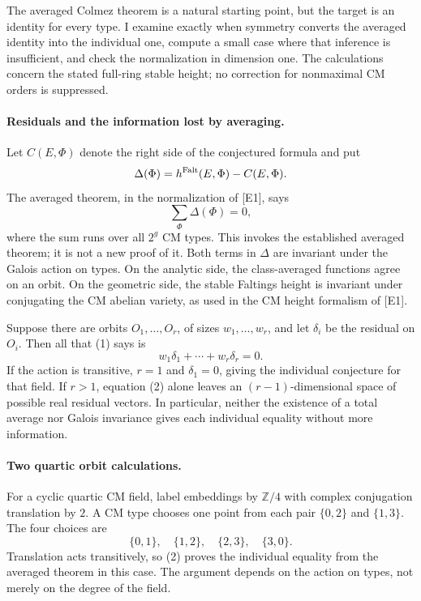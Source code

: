 \documentclass[11pt]{article}
\begin{document}
The averaged Colmez theorem is a natural starting point, but the target
is an identity for every type. I examine exactly when symmetry converts
the averaged identity into the individual one, compute a small case
where that inference is insufficient, and check the normalization in
dimension one. The calculations concern the stated full-ring stable
height; no correction for nonmaximal CM orders is suppressed.

\paragraph{Residuals and the information lost by averaging.}
Let $C(E,\Phi)$ denote the right side of the conjectured formula and put
\[
 \Delta(\Phi)=h^{\rm Falt}(E,\Phi)-C(E,\Phi).
\]
The averaged theorem, in the normalization of [E1], says
\[
 \sum_{\Phi}\Delta(\Phi)=0,                           \tag{1}
\]
where the sum runs over all $2^g$ CM types. This invokes the established
averaged theorem; it is not a new proof of it. Both terms in $\Delta$
are invariant under the Galois action on types. On the analytic side,
the class-averaged functions agree on an orbit. On the geometric side,
the stable Faltings height is invariant under conjugating the CM
abelian variety, as used in the CM height formalism of [E1].

Suppose there are orbits $O_1,\ldots,O_r$, of sizes $w_1,\ldots,w_r$,
and let $\delta_i$ be the residual on $O_i$. Then all that (1) says is
\[
 w_1\delta_1+\cdots+w_r\delta_r=0.                    \tag{2}
\]
If the action is transitive, $r=1$ and $\delta_1=0$, giving the
individual conjecture for that field. If $r>1$, equation (2) alone
leaves an $(r-1)$-dimensional space of possible real residual vectors.
In particular, neither the existence of a total average nor Galois
invariance gives each individual equality without more information.

\paragraph{Two quartic orbit calculations.}
For a cyclic quartic CM field, label embeddings by $\mathbb Z/4$ with
complex conjugation translation by $2$. A CM type chooses one point
from each pair $\{0,2\}$ and $\{1,3\}$. The four choices are
\[
 \{0,1\},\quad\{1,2\},\quad\{2,3\},\quad\{3,0\}.
\]
Translation acts transitively, so (2) proves the individual equality
from the averaged theorem in this case. The argument depends on the
action on types, not merely on the degree of the field.
\end{document}
